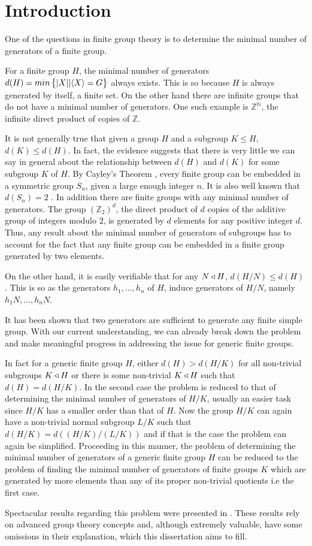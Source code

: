 \chapter*{Introduction}
One of the questions in finite group theory is to determine the minimal number of generators of a finite group.

For a finite group $H$, the minimal number of generators $d(H) = min\left\{| X ||\langle X \rangle = G \right\}$ always exists. This is so because $H$ is always generated by itself, a finite set. On the other hand there are infinite groups that do not have a minimal number of generators. One such example is $\mathbb{Z}^{\mathbb{N}}$, the infinite direct product of copies of $\mathbb{Z}$.

It is not generally true that given a group $H$ and a subgroup $K \le H$, $d(K) \le d(H)$. 
In fact, the evidence suggests that there is very little we can say in general about the relationship between $d(H)$ and $d(K)$ for some subgroup $K$ of $H$. By Cayley's Theorem \cite[p.~52]{RotmanITG}, every finite group can be embedded in a symmetric group $S_n$, given a large enough integer $n$. It is also well known that $d(S_n) = 2$ \cite[p.~24]{RotmanITG}. In addition there are finite groups with any minimal number of generators. The group $(\mathbb{Z}_2)^d$, the direct product of $d$ copies of the additive group of integers modulo $2$, is generated by $d$ elements for any positive integer $d$. Thus, any result about the minimal number of generators of subgroups has to account for the fact that any finite group can be embedded in a finite group generated by two elements.

On the other hand, it is easily verifiable that for any $N \triangleleft H$, $d(H/N) \le d(H)$. 
This is so as the generators $h_1,\ldots,h_n$ of $H$, induce generators of $H/N$, namely $h_1N, \ldots , h_nN$.


It has been shown \cite{AschbacherSAFCG} that two generators are sufficient to generate any finite simple group.
With our current understanding, we can already break down the problem and make meaningful progress in addressing the issue for generic finite groups.

In fact for a generic finite group $H$, either $d(H) > d(H/K)$ for all non-trivial subgroups $K \triangleleft H$ or there is some non-trivial $K \triangleleft H$ such that $d(H) = d(H/K)$. In the second case the problem is reduced to that of determining the minimal number of generators of $H/K$, usually an easier task since $H/K$ has a smaller order than that of $H$. Now the group $H/K$ can again have a non-trivial normal subgroup $L/K$ such that $d(H/K) = d((H/K)/(L/K))$ and if that is the case the problem can again be simplified. Proceeding in this manner, the problem of determining the minimal number of generators of a generic finite group $H$ can be reduced to the problem of finding the minimal number of generators of finite groups $K$ which are generated by more elements than any of its proper non-trivial quotients i.e the first case.

Spectacular results regarding this problem were presented in \cite{DallaVoltaFGNMGAPQ}. These results rely on advanced group theory concepts and, although extremely valuable, have some omissions in their explanation, which this dissertation aims to fill.
